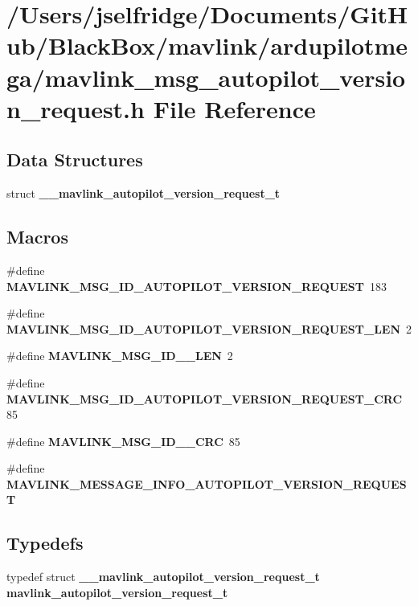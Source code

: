 \section{/\+Users/jselfridge/\+Documents/\+Git\+Hub/\+Black\+Box/mavlink/ardupilotmega/mavlink\+\_\+msg\+\_\+autopilot\+\_\+version\+\_\+request.h File Reference}
\label{mavlink__msg__autopilot__version__request_8h}
\subsection*{Data Structures}
\begin{DoxyCompactItemize}
\item 
struct \textbf{ \+\_\+\+\_\+mavlink\+\_\+autopilot\+\_\+version\+\_\+request\+\_\+t}
\end{DoxyCompactItemize}
\subsection*{Macros}
\begin{DoxyCompactItemize}
\item 
\#define \textbf{ M\+A\+V\+L\+I\+N\+K\+\_\+\+M\+S\+G\+\_\+\+I\+D\+\_\+\+A\+U\+T\+O\+P\+I\+L\+O\+T\+\_\+\+V\+E\+R\+S\+I\+O\+N\+\_\+\+R\+E\+Q\+U\+E\+ST}~183
\item 
\#define \textbf{ M\+A\+V\+L\+I\+N\+K\+\_\+\+M\+S\+G\+\_\+\+I\+D\+\_\+\+A\+U\+T\+O\+P\+I\+L\+O\+T\+\_\+\+V\+E\+R\+S\+I\+O\+N\+\_\+\+R\+E\+Q\+U\+E\+S\+T\+\_\+\+L\+EN}~2
\item 
\#define \textbf{ M\+A\+V\+L\+I\+N\+K\+\_\+\+M\+S\+G\+\_\+\+I\+D\+\_\+\_\+\+L\+EN}~2
\item 
\#define \textbf{ M\+A\+V\+L\+I\+N\+K\+\_\+\+M\+S\+G\+\_\+\+I\+D\+\_\+\+A\+U\+T\+O\+P\+I\+L\+O\+T\+\_\+\+V\+E\+R\+S\+I\+O\+N\+\_\+\+R\+E\+Q\+U\+E\+S\+T\+\_\+\+C\+RC}~85
\item 
\#define \textbf{ M\+A\+V\+L\+I\+N\+K\+\_\+\+M\+S\+G\+\_\+\+I\+D\+\_\+\_\+\+C\+RC}~85
\item 
\#define \textbf{ M\+A\+V\+L\+I\+N\+K\+\_\+\+M\+E\+S\+S\+A\+G\+E\+\_\+\+I\+N\+F\+O\+\_\+\+A\+U\+T\+O\+P\+I\+L\+O\+T\+\_\+\+V\+E\+R\+S\+I\+O\+N\+\_\+\+R\+E\+Q\+U\+E\+ST}
\end{DoxyCompactItemize}
\subsection*{Typedefs}
\begin{DoxyCompactItemize}
\item 
typedef struct \textbf{ \+\_\+\+\_\+mavlink\+\_\+autopilot\+\_\+version\+\_\+request\+\_\+t} \textbf{ mavlink\+\_\+autopilot\+\_\+version\+\_\+request\+\_\+t}
\end{DoxyCompactItemize}


